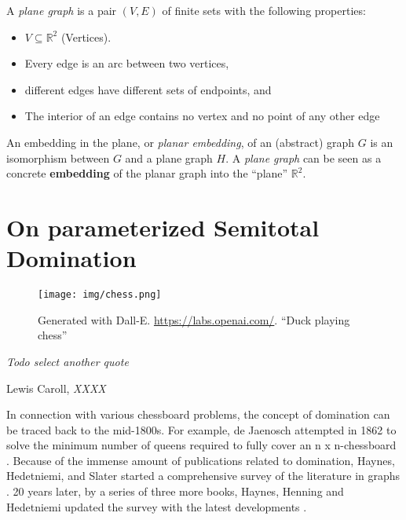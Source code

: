 \begin{graphclass}[Planar]

A \textit{plane graph} is a pair $(V,E)$ of finite sets with the following properties:

\begin{itemize}
    \item $V \subseteq \mathbb{R}^2$ (Vertices).
    \vspace{-2mm}
    \item Every edge is an arc between two vertices, 
    \vspace{-2mm}
    \item different edges have different sets of endpoints, and
    \vspace{-2mm}
    \item The interior of an edge contains no vertex and no point of any other edge
\end{itemize}

An embedding in the plane, or \textit{planar embedding}, of an (abstract) graph $G$ is an isomorphism between $G$ and a plane graph $H$. A \textit{plane graph} can be seen as a concrete \textbf{embedding} of the planar graph into the ``plane'' $\mathbb{R}^2$.

\end{graphclass}



\chapter{On parameterized Semitotal Domination}\label{ch:semitotal-domination}

\vspace*{-50pt}

\begin{figure}[ht]
        \texttt{[image: img/chess.png]}
        \captionsetup{textformat=empty,labelformat=blank}
        \caption{Generated with Dall-E. \url{https://labs.openai.com/}. ``Duck playing chess''}
\end{figure}

\epigraph{\itshape Todo select another quote}{Lewis Caroll, \textit{XXXX}}

In connection with various chessboard problems, the concept of domination can be traced back to the mid-1800s.
For example, de Jaenosch attempted in 1862 to solve the minimum number of queens required to fully cover an n x n-chessboard \cite{Jaenisch1862}. Because of the immense amount of publications related to domination, Haynes, Hedetniemi, and Slater started a comprehensive survey of the literature in graphs \cite{Haynes1998, Haynes1998b}. 
20 years later, by a series of three more books, Haynes, Henning and Hedetniemi updated the survey with the latest developments \cite{Haynes2020, Haynes2021, Haynes2022}.

